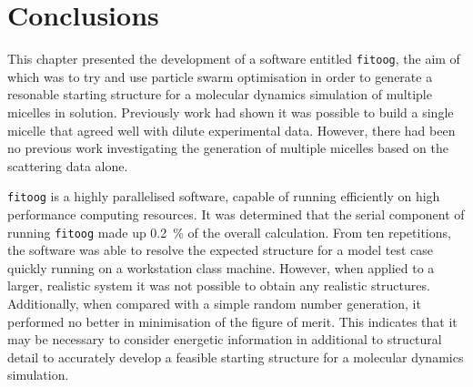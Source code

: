 \section{Conclusions}
This chapter presented the development of a software entitled \texttt{fitoog}, the aim of which was to try and use particle swarm optimisation in order to generate a resonable starting structure for a molecular dynamics simulation of multiple micelles in solution.
Previously work had shown it was possible to build a single micelle that agreed well with dilute experimental data.
However, there had been no previous work investigating the generation of multiple micelles based on the scattering data alone.

\texttt{fitoog} is a highly parallelised software, capable of running efficiently on high performance computing resources.
It was determined that the serial component of running \texttt{fitoog} made up \SI{0.2}{\percent} of the overall calculation.
From ten repetitions, the software was able to resolve the expected structure for a model test case quickly running on a workstation class machine.
However, when applied to a larger, realistic system it was not possible to obtain any realistic structures.
Additionally, when compared with a simple random number generation, it performed no better in minimisation of the figure of merit. 
This indicates that it may be necessary to consider energetic information in additional to structural detail to accurately develop a feasible starting structure for a molecular dynamics simulation. 